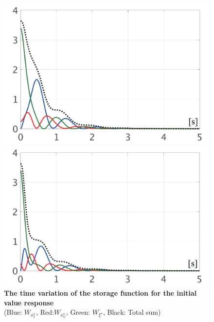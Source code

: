 \documentclass[graybox, envcountchap]{svmult}
\begin{document}
\begin{figure}[t]
  \centering
  {
  \begin{minipage}{0.49\linewidth}
    \centering
    \includegraphics[width = 1.0\linewidth]{figs/Wnlin1}
  \end{minipage}
  \begin{minipage}{0.49\linewidth}
    \centering
    \includegraphics[width = 1.0\linewidth]{figs/Wnlin2}
  \end{minipage}
  }
  \medskip
  \caption{\textbf{The time variation of the storage function for the initial value response}
  \\  \centering(Blue: $W_{x^{\star}_{\mathds{F}}}$, Red:$W_{x^{\star}_{\mathds{G}}}$,
  Green: $W_{\xi^{\star}}$, Black: Total sum)}
  \label{fig:LyapWnlin}
\medskip
\end{figure}
\end{document}
